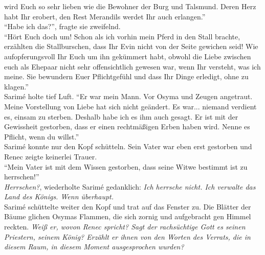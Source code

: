 wird Euch so sehr lieben wie die Bewohner der Burg und Talsmund. Deren Herz habt Ihr erobert, den 
Rest Merandils werdet Ihr auch erlangen.''\\
``Habe ich das?'', fragte sie zweifelnd.\\
``Hört Euch doch um! Schon als ich vorhin mein Pferd in den Stall brachte, erzählten die 
Stallburschen, dass Ihr Evin nicht von der Seite gewichen seid! Wie aufopferungsvoll Ihr Euch um 
ihn gekümmert habt, obwohl die Liebe zwischen euch als Ehepaar nicht sehr offensichtlich gewesen 
war, wenn Ihr versteht, was ich meine. Sie bewundern Euer Pflichtgefühl und dass Ihr Dinge 
erledigt, ohne zu klagen.''\\
Sarimé holte tief Luft. ``Er war mein Mann. Vor Osyma und Zeugen angetraut. Meine Vorstellung von 
Liebe hat sich nicht geändert. Es war... niemand verdient es, einsam zu sterben. Deshalb habe ich 
es ihm auch gesagt. Er ist mit der Gewissheit gestorben, dass er einen rechtmäßigen Erben haben 
wird. Nenne es Pflicht, wenn du willst.''\\ 
Sarimé konnte nur den Kopf schütteln. Sein Vater war eben erst gestorben und Renec zeigte keinerlei 
Trauer.\\
``Mein Vater ist mit dem Wissen gestorben, dass seine Witwe bestimmt ist zu herrschen!''\\
\textit{Herrschen?}, wiederholte Sarimé gedanklich: \textit{Ich herrsche nicht. Ich verwalte das 
Land des Königs. Wenn überhaupt.}\\
Sarimé schüttelte weiter den Kopf und trat auf das Fenster zu. Die Blätter der Bäume glichen Osymas 
Flammen, die sich zornig und aufgebracht gen Himmel reckten. \textit{Weiß er, wovon Renec spricht? 
Sagt der rachsüchtige Gott es seinen Priestern, seinem König? Erzählt er ihnen von den Worten des 
Verrats, die in diesem Raum, in diesem Moment ausgesprochen wurden?}\\
